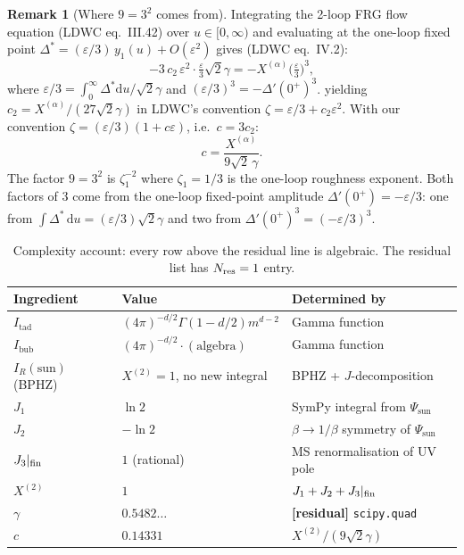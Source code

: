 \documentclass[10pt,a4paper,twocolumn]{article}
\theoremstyle{plain}
\theoremstyle{definition}
\newtheorem{remark}{Remark}
\newcommand{\dd}{\mathrm{d}}
\renewcommand{\Psi}{\varPsi}
\newcommand{\eps}{\varepsilon}
\newcommand{\Nres}{N_{\rm res}}
\begin{document}
\begin{remark}[Where $9 = 3^2$ comes from]
Integrating the 2-loop FRG flow equation (LDWC eq.~III.42) over
$u \in [0,\infty)$ and evaluating at the one-loop fixed point
$\Delta^* = (\eps/3)\,y_1(u) + O(\eps^2)$ gives (LDWC eq.~IV.2):
\begin{equation}\label{eq:frg-integrated}
  -3\,c_2\,\eps^2\cdot\tfrac{\eps}{3}\sqrt{2}\gamma
  = -X^{(\alpha)}\bigl(\tfrac{\eps}{3}\bigr)^3,
\end{equation}
where $\eps/3 = \int_0^\infty\Delta^*\dd u / \sqrt{2}\gamma$
and $(\eps/3)^3 = -\Delta'(0^+)^3$.
yielding $c_2 = X^{(\alpha)}/(27\sqrt{2}\gamma)$ in LDWC's convention
$\zeta = \eps/3 + c_2\eps^2$.  With our convention
$\zeta = (\eps/3)(1 + c\eps)$, i.e.\ $c = 3c_2$:
\[
  c = \frac{X^{(\alpha)}}{9\sqrt{2}\,\gamma}.
\]
The factor $9 = 3^2$ is $\zeta_1^{-2}$ where $\zeta_1 = 1/3$ is
the one-loop roughness exponent.  Both factors of $3$ come from the
one-loop fixed-point amplitude $\Delta'(0^+) = -\eps/3$: one from
$\int\Delta^*\,\dd u = (\eps/3)\sqrt{2}\gamma$ and two from
$\Delta'(0^+)^3 = (-\eps/3)^3$.
\end{remark}

\begin{table}[t]
\centering
\renewcommand{\arraystretch}{1.3}
\begin{tabular}{lll}
\toprule
Ingredient & Value & Determined by \\
\midrule
$I_{\text{tad}}$ & $(4\pi)^{-d/2}\Gamma(1-d/2)m^{d-2}$ & Gamma function \\
$I_{\text{bub}}$ & $(4\pi)^{-d/2}\cdot(\text{algebra})$ & Gamma function \\
$I_R(\text{sun})$ (BPHZ) & $X^{(2)}\!=1$, no new integral & BPHZ + $J$-decomposition \\
$J_1$ & $\ln 2$ & SymPy integral from $\Psi_{\text{sun}}$ \\
$J_2$ & $-\ln 2$ & $\beta\to 1/\beta$ symmetry of $\Psi_{\text{sun}}$ \\
$J_3|_{\rm fin}$ & $1$ (rational) & MS renormalisation of UV pole \\
$X^{(2)}$ & $1$ & $J_1+J_2+J_3|_{\rm fin}$ \\
$\gamma$ & $0.5482\ldots$ & \textbf{[residual]} \texttt{scipy.quad} \\
\midrule
$c$ & $0.14331$ & $X^{(2)}/(9\sqrt{2}\gamma)$ \\
\bottomrule
\end{tabular}
\caption{Complexity account: every row above the residual line is
  algebraic.  The residual list has $\Nres = 1$ entry.}
\label{tab:complexity}
\end{table}
\end{document}
